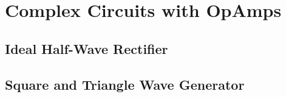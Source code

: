 \chapter{Complex Circuits with OpAmps}
\section{Ideal Half-Wave Rectifier}

\section{Square and Triangle Wave Generator}
